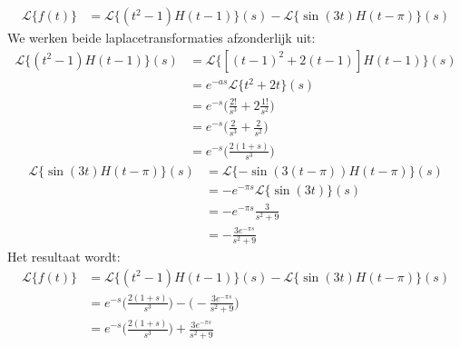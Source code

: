 \documentclass[12pt]{report}
\begin{document}
{
\begin{equation*}
\begin{split}
\mathcal{L}\{f(t)\} & = \mathcal{L}\{(t^2 - 1)H(t - 1)\}(s) - \mathcal{L}\{\sin(3t)H(t-\pi)\}(s)
\end{split}
\end{equation*}
We werken beide laplacetransformaties afzonderlijk uit:
\begin{equation*}
\begin{split}
\mathcal{L}\{(t^2 - 1)H(t - 1)\}(s) & = \mathcal{L}\{[(t-1)^2 + 2(t - 1)]H(t - 1)\}(s)\\
                                    & = e^{-as}\mathcal{L}\{t^2 + 2t\}(s) \\
                                    & = e^{-s}\bigg(\frac{2!}{s^3} + 2\frac{1!}{s^2}\bigg) \\
                                    & = e^{-s}\bigg(\frac{2}{s^3} + \frac{2}{s^2}\bigg)\\
                                    & = e^{-s}\bigg(\frac{2(1 + s)}{s^3}\bigg)
\end{split}
\end{equation*}
\begin{equation*}
\begin{split}
\mathcal{L}\{\sin(3t)H(t-\pi)\}(s) & =  \mathcal{L}\{-\sin(3(t - \pi))H(t-\pi)\}(s) \\
                                    & = -e^{-\pi s}\mathcal{L}\{\sin (3t)\}(s) \\
                                    & = -e^{-\pi s}\frac{3}{s^2 + 9} \\
                                    & = -\frac{3e^{-\pi s}}{s^2 + 9}
\end{split}
\end{equation*}
Het resultaat wordt:
\begin{equation*}
\begin{split}
\mathcal{L}\{f(t)\} & = \mathcal{L}\{(t^2 - 1)H(t - 1)\}(s) - \mathcal{L}\{\sin(3t)H(t-\pi)\}(s) \\
                    & = e^{-s}\bigg(\frac{2(1 + s)}{s^3}\bigg) - \bigg(-\frac{3e^{-\pi s}}{s^2 + 9}\bigg) \\
                    & = e^{-s}\bigg(\frac{2(1 + s)}{s^3}\bigg) +\frac{3e^{-\pi s}}{s^2 + 9}
\end{split}
\end{equation*}
}
\end{document}

